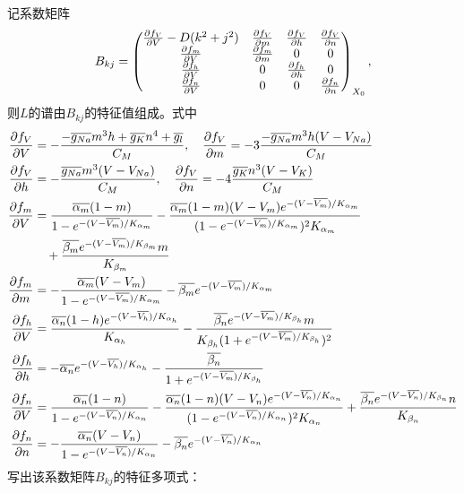 \documentclass[
bachelor,
nofont, %
pdflinks,
]{xjtuthesis}
\begin{document}
记系数矩阵
\begin{align*}
B _{kj} = \left(
\begin{matrix} 
\pfr{f_V}{V} - D(k^2+j^2) & \pfr{f_V}{m} & \pfr{f_V}{h} & \pfr{f_V}{n}\\ 
\pfr{f_m}{V} & \pfr{f_m}{m} & 0 & 0\\ 
\pfr{f_h}{V} & 0 & \pfr{f_h}{h} & 0 \\
\pfr{f_n}{V} & 0 & 0 & \pfr{f_n}{n}
\end{matrix}
\right) _{X_0},
\end{align*}
则$L$的谱由$B _{kj}$的特征值组成。式中
\begin{align*}
\pfr{f_V}{V} &= -\dfrac{-\gnabar m^3h+\gkbar n^4+\glbar}{C_M}, \quad 
\pfr{f_V}{m} = -3\dfrac{-\gnabar m^3h(V-\vna)}{C_M} \\
\pfr{f_V}{h} &= - \dfrac{\gnabar m^3(V -\vna)}{C_M}, \quad
\pfr{f_V}{n} = -4 \dfrac{\gkbar n^3(V-\vk)}{C_M} \\
\pfr{f_m}{V} &= \dfrac{\ambar (1-m)}{1- e^{-(V-\vmbar)/K_{\am}}} - \dfrac{\ambar (1-m)(V -V_{m})e^{-(V-\vmbar)/K_{\am}}}{(1- e^{-(V-\vmbar)/K_{\am}})^2 K_{\am}} \\
&\quad + \dfrac{\bmbar e^{-(V-\vmbar)/K_{\bm}}m}{K_{\bm}}\\
\pfr{f_m}{m} &= -\dfrac{\ambar (V -V_{m})}{1- e^{-(V-\vmbar)/K_{\am}}}-\bmbar e^{-(V-\vmbar)/K_{\am}}\\
\pfr{f_h}{V} &= \dfrac{\ahbar (1-h)e^{-(V-\vhbar)/K_{\ah}}}{K_{\ah}}-\dfrac{\bhbar e^{-(V-\vmbar)/K_{\bh}}m}{K_{\bh}(1+e^{-(V-\vmbar)/K_{\bh}})^2}\\
\pfr{f_h}{h} &= -\ahbar e^{-(V-\vhbar)/K_{\ah}} - \dfrac{\bhbar }{1+e^{-(V-\vmbar)/K_{\bh}}}\\
\pfr{f_n}{V} &= \dfrac{\anbar (1-n)}{1- e^{-(V-\vnbar)/K_{\an}}} - \dfrac{\anbar (1-n)(V -V_{n})e^{-(V-\vnbar)/K_{\an}}}{(1- e^{-(V-\vnbar)/K_{\an}})^2 K_{\an}} + \dfrac{\bnbar e^{-(V-\vnbar)/K_{\bn}}n}{K_{\bn}}\\
\pfr{f_n}{n} &= -\dfrac{\anbar (V -V_{n})}{1- e^{-(V-\vnbar)/K_{\an}}}-\bnbar e^{-(V-\vnbar)/K_{\an}}
\end{align*}
写出该系数矩阵$B _{kj}$的特征多项式：
\end{document}
